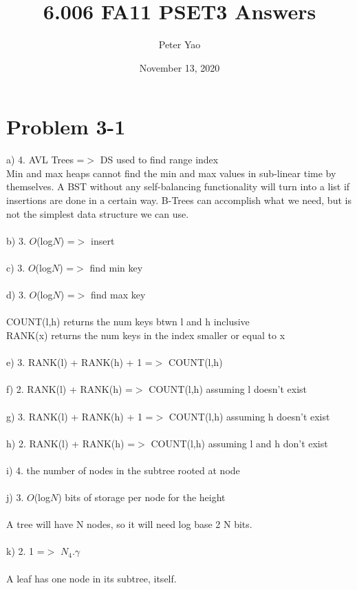 \documentclass{article}
\title{6.006 FA11 PSET3 Answers}
\author{Peter Yao}
\date{November 13, 2020}
\begin{document}
\maketitle

\section{Problem 3-1}
a) 4. AVL Trees =$>$ DS used to find range index \\
Min and max heaps cannot find the min and max values in sub-linear time by themselves. A BST without any self-balancing functionality will turn into a list if insertions are done in a certain way. B-Trees can accomplish what we need, but is not the simplest data structure we can use. \\\\
b) 3. $O$(log$N$) =$>$ insert \\\\
c) 3. $O$(log$N$) =$>$ find min key \\\\
d) 3. $O$(log$N$) =$>$ find max key \\\\
COUNT(l,h) returns the num keys btwn l and h inclusive \\
RANK(x) returns the num keys in the index smaller or equal to x \\\\
e) 3. RANK(l) + RANK(h) + 1 =$>$ COUNT(l,h) \\\\
f) 2. RANK(l) + RANK(h) =$>$ COUNT(l,h) assuming l doesn't exist \\\\
g) 3. RANK(l) + RANK(h) + 1 =$>$ COUNT(l,h) assuming h doesn't exist \\\\
h) 2. RANK(l) + RANK(h) =$>$ COUNT(l,h) assuming l and h don't exist \\\\
i) 4. the number of nodes in the subtree rooted at node \\\\
j) 3. $O$(log$N$) bits of storage per node for the height \\\\
A tree will have N nodes, so it will need log base 2 N bits. \\\\
k) 2. 1 =$>$ $N_4.\gamma$ \\\\
A leaf has one node in its subtree, itself. \\\\
\end{document}
